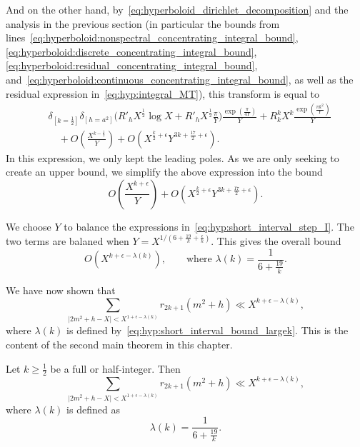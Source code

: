 And on the other hand, by~\eqref{eq:hyperboloid_dirichlet_decomposition} and the analysis
in the previous section (in particular the bounds from
lines~\eqref{eq:hyperboloid:nonspectral_concentrating_integral_bound},
\eqref{eq:hyperboloid:discrete_concentrating_integral_bound},
\eqref{eq:hyperboloid:residual_concentrating_integral_bound},
and~\eqref{eq:hyperboloid:continuous_concentrating_integral_bound}, as well as the
residual expression in~\eqref{eq:hyp:integral_MT}), this transform is
equal to
\begin{align}
  &\delta_{[k = \frac{1}{2}]} \delta_{[h = a^2]} \bigg(R'_h X^{\frac{1}{2}}\log X +R'_h
X^{\frac{1}{2}} \frac{\pi}{Y} \bigg)\frac{\exp(\frac{\pi}{4Y})}{Y} + R_k^k X^k
\frac{\exp(\frac{\pi k^2}{Y})}{Y} \\
  &\quad + O(\frac{X^{k-\frac{1}{2}}}{Y})
  + O(X^{\frac{k}{2} + \epsilon} Y^{3k + \frac{17}{2} + \epsilon}).
\end{align}
In this expression, we only kept the leading poles.
As we are only seeking to create an upper bound, we simplify the above expression into the
bound
\begin{equation}\label{eq:hyp:short_interval_step_I}
  O(\frac{X^{k+\epsilon}}{Y})
  + O(X^{\frac{k}{2}+\epsilon} Y^{3k + \frac{17}{2} + \epsilon}).
\end{equation}


We choose $Y$ to balance the expressions in~\eqref{eq:hyp:short_interval_step_I}.
The two terms are balaned when $Y = X^{1/(6 + \frac{19}{k} + \frac{\epsilon}{k})}$.
This gives the overall bound
\begin{equation}\label{eq:hyp:short_interval_bound_largek}
  O(X^{k + \epsilon - \lambda(k)}), \qquad \text{where } \lambda(k) = \frac{1}{6 +
  \frac{19}{k}}.
\end{equation}


We have now shown that
\begin{equation}
  \sum_{\lvert 2m^2 + h - X \rvert < X^{1 + \epsilon - \lambda(k)}} r_{2k+1}(m^2 + h) \ll
  X^{k + \epsilon - \lambda(k)},
\end{equation}
where $\lambda(k)$ is defined by~\eqref{eq:hyp:short_interval_bound_largek}.
This is the content of the second main theorem in this chapter.
\begin{theorem}\label{thm:hyp:concentrating_theorem_full}
  Let $k \geq \frac{1}{2}$ be a full or half-integer.
  Then
  \begin{equation}
    \sum_{\lvert 2m^2 + h - X \rvert < X^{1 + \epsilon - \lambda(k)}} r_{2k+1}(m^2 + h)
    \ll X^{k + \epsilon - \lambda(k)},
  \end{equation}
  where $\lambda(k)$ is defined as
  \begin{equation}
    \lambda(k) = \frac{1}{6 + \frac{19}{k}}.
  \end{equation}
\end{theorem}



